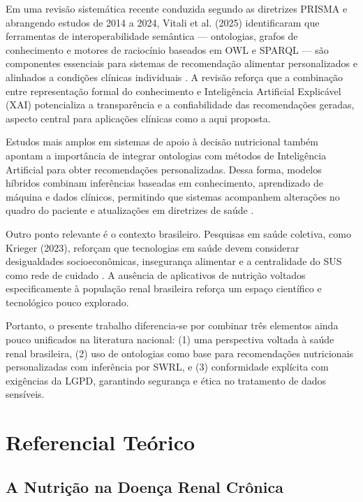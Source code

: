 \documentclass[12pt, a4paper, twocolumn]{article}
\begin{document}
Em uma revisão sistemática recente conduzida segundo as diretrizes PRISMA e abrangendo estudos de 2014 a 2024, Vitali et al. (2025) identificaram que ferramentas de interoperabilidade semântica --- ontologias, grafos de conhecimento e motores de raciocínio baseados em OWL e SPARQL --- são componentes essenciais para sistemas de recomendação alimentar personalizados e alinhados a condições clínicas individuais \cite{vitali2025}. A revisão reforça que a combinação entre representação formal do conhecimento e Inteligência Artificial Explicável (XAI) potencializa a transparência e a confiabilidade das recomendações geradas, aspecto central para aplicações clínicas como a aqui proposta.

Estudos mais amplos em sistemas de apoio à decisão nutricional também apontam a importância de integrar ontologias com métodos de Inteligência Artificial para obter recomendações personalizadas. Dessa forma, modelos híbridos combinam inferências baseadas em conhecimento, aprendizado de máquina e dados clínicos, permitindo que sistemas acompanhem alterações no quadro do paciente e atualizações em diretrizes de saúde \cite{mendes2021,zhang2023}.

Outro ponto relevante é o contexto brasileiro. Pesquisas em saúde coletiva, como Krieger (2023), reforçam que tecnologias em saúde devem considerar desigualdades socioeconômicas, insegurança alimentar e a centralidade do SUS como rede de cuidado \cite{krieger2023}. A ausência de aplicativos de nutrição voltados especificamente à população renal brasileira reforça um espaço científico e tecnológico pouco explorado.

Portanto, o presente trabalho diferencia-se por combinar três elementos ainda pouco unificados na literatura nacional: (1) uma perspectiva voltada à saúde renal brasileira, (2) uso de ontologias como base para recomendações nutricionais personalizadas com inferência por SWRL, e (3) conformidade explícita com exigências da LGPD, garantindo segurança e ética no tratamento de dados sensíveis.

\section{Referencial Teórico}

    \subsection{A Nutrição na Doença Renal Crônica}
\end{document}
